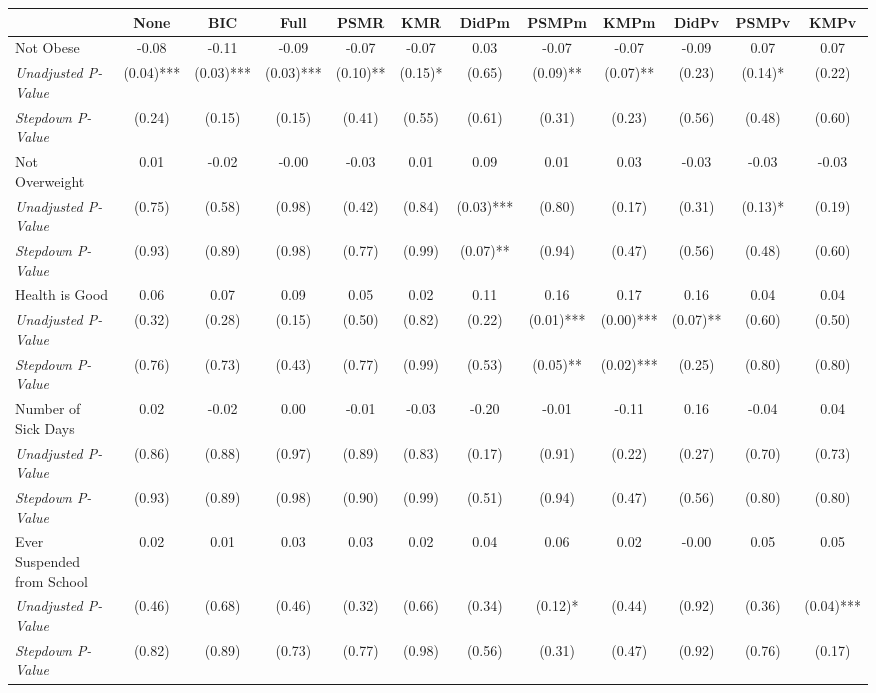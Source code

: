 \begin{tabular}{l c c c c c c c c c c c}
\toprule
 & None & BIC & Full & PSMR & KMR & DidPm & PSMPm & KMPm & DidPv & PSMPv & KMPv \\
\midrule
Not Obese & -0.08 & -0.11 & -0.09 & -0.07 & -0.07 & 0.03 & -0.07 & -0.07 & -0.09 & 0.07 & 0.07 \\
\quad \textit{Unadjusted P-Value} & (0.04)*** & (0.03)*** & (0.03)*** & (0.10)** & (0.15)* & (0.65) & (0.09)** & (0.07)** & (0.23) & (0.14)* & (0.22) \\
\quad \textit{Stepdown P-Value} & (0.24) & (0.15) & (0.15) & (0.41) & (0.55) & (0.61) & (0.31) & (0.23) & (0.56) & (0.48) & (0.60) \\
Not Overweight & 0.01 & -0.02 & -0.00 & -0.03 & 0.01 & 0.09 & 0.01 & 0.03 & -0.03 & -0.03 & -0.03 \\
\quad \textit{Unadjusted P-Value} & (0.75) & (0.58) & (0.98) & (0.42) & (0.84) & (0.03)*** & (0.80) & (0.17) & (0.31) & (0.13)* & (0.19) \\
\quad \textit{Stepdown P-Value} & (0.93) & (0.89) & (0.98) & (0.77) & (0.99) & (0.07)** & (0.94) & (0.47) & (0.56) & (0.48) & (0.60) \\
Health is Good & 0.06 & 0.07 & 0.09 & 0.05 & 0.02 & 0.11 & 0.16 & 0.17 & 0.16 & 0.04 & 0.04 \\
\quad \textit{Unadjusted P-Value} & (0.32) & (0.28) & (0.15) & (0.50) & (0.82) & (0.22) & (0.01)*** & (0.00)*** & (0.07)** & (0.60) & (0.50) \\
\quad \textit{Stepdown P-Value} & (0.76) & (0.73) & (0.43) & (0.77) & (0.99) & (0.53) & (0.05)** & (0.02)*** & (0.25) & (0.80) & (0.80) \\
Number of Sick Days & 0.02 & -0.02 & 0.00 & -0.01 & -0.03 & -0.20 & -0.01 & -0.11 & 0.16 & -0.04 & 0.04 \\
\quad \textit{Unadjusted P-Value} & (0.86) & (0.88) & (0.97) & (0.89) & (0.83) & (0.17) & (0.91) & (0.22) & (0.27) & (0.70) & (0.73) \\
\quad \textit{Stepdown P-Value} & (0.93) & (0.89) & (0.98) & (0.90) & (0.99) & (0.51) & (0.94) & (0.47) & (0.56) & (0.80) & (0.80) \\
Ever Suspended from School & 0.02 & 0.01 & 0.03 & 0.03 & 0.02 & 0.04 & 0.06 & 0.02 & -0.00 & 0.05 & 0.05 \\
\quad \textit{Unadjusted P-Value} & (0.46) & (0.68) & (0.46) & (0.32) & (0.66) & (0.34) & (0.12)* & (0.44) & (0.92) & (0.36) & (0.04)*** \\
\quad \textit{Stepdown P-Value} & (0.82) & (0.89) & (0.73) & (0.77) & (0.98) & (0.56) & (0.31) & (0.47) & (0.92) & (0.76) & (0.17) \\
\bottomrule
\end{tabular}
